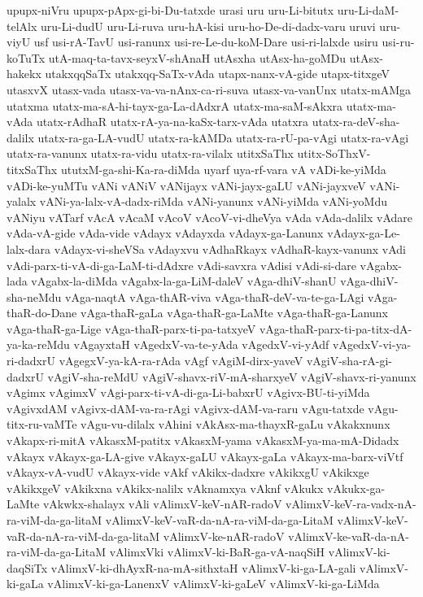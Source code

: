 {upupx-niVru
upupx-pApx-gi-bi-Du-tatxde
urasi
uru
uru-Li-bitutx
uru-Li-daM-telAlx
uru-Li-dudU
uru-Li-ruva
uru-hA-kisi
uru-ho-De-di-dadx-varu
uruvi
uru-viyU
usf
usi-rA-TavU
usi-ranunx
usi-re-Le-du-koM-Dare
usi-ri-lalxde
usiru
usi-ru-koTuTx
utA-maq-ta-tavx-seyxV-shAnaH
utAsxha
utAsx-ha-goMDu
utAsx-hakekx
utakxqqSaTx
utakxqq-SaTx-vAda
utapx-nanx-vA-gide
utapx-titxgeV
utasxvX
utasx-vada
utasx-va-va-nAnx-ca-ri-suva
utasx-va-vanUnx
utatx-mAMga
utatxma
utatx-ma-sA-hi-tayx-ga-La-dAdxrA
utatx-ma-saM-sAkxra
utatx-ma-vAda
utatx-rAdhaR
utatx-rA-ya-na-kaSx-tarx-vAda
utatxra
utatx-ra-deV-sha-dalilx
utatx-ra-ga-LA-vudU
utatx-ra-kAMDa
utatx-ra-rU-pa-vAgi
utatx-ra-vAgi
utatx-ra-vanunx
utatx-ra-vidu
utatx-ra-vilalx
utitxSaThx
utitx-SoThxV-titxSaThx
ututxM-ga-shi-Ka-ra-diMda
uyarf
uya-rf-vara
vA
vADi-ke-yiMda
vADi-ke-yuMTu
vANi
vANiV
vANijayx
vANi-jayx-gaLU
vANi-jayxveV
vANi-yalalx
vANi-ya-lalx-vA-dadx-riMda
vANi-yanunx
vANi-yiMda
vANi-yoMdu
vANiyu
vATarf
vAcA
vAcaM
vAcoV
vAcoV-vi-dheVya
vAda
vAda-dalilx
vAdare
vAda-vA-gide
vAda-vide
vAdayx
vAdayxda
vAdayx-ga-Lanunx
vAdayx-ga-Le-lalx-dara
vAdayx-vi-sheVSa
vAdayxvu
vAdhaRkayx
vAdhaR-kayx-vanunx
vAdi
vAdi-parx-ti-vA-di-ga-LaM-ti-dAdxre
vAdi-savxra
vAdisi
vAdi-si-dare
vAgabx-lada
vAgabx-la-diMda
vAgabx-la-ga-LiM-daleV
vAga-dhiV-shanU
vAga-dhiV-sha-neMdu
vAga-naqtA
vAga-thAR-viva
vAga-thaR-deV-va-te-ga-LAgi
vAga-thaR-do-Dane
vAga-thaR-gaLa
vAga-thaR-ga-LaMte
vAga-thaR-ga-Lanunx
vAga-thaR-ga-Lige
vAga-thaR-parx-ti-pa-tatxyeV
vAga-thaR-parx-ti-pa-titx-dA-ya-ka-reMdu
vAgayxtaH
vAgedxV-va-te-yAda
vAgedxV-vi-yAdf
vAgedxV-vi-ya-ri-dadxrU
vAgegxV-ya-kA-ra-rAda
vAgf
vAgiM-dirx-yaveV
vAgiV-sha-rA-gi-dadxrU
vAgiV-sha-reMdU
vAgiV-shavx-riV-mA-sharxyeV
vAgiV-shavx-ri-yanunx
vAgimx
vAgimxV
vAgi-parx-ti-vA-di-ga-Li-babxrU
vAgivx-BU-ti-yiMda
vAgivxdAM
vAgivx-dAM-va-ra-rAgi
vAgivx-dAM-va-raru
vAgu-tatxde
vAgu-titx-ru-vaMTe
vAgu-vu-dilalx
vAhini
vAkAsx-ma-thayxR-gaLu
vAkakxnunx
vAkapx-ri-mitA
vAkasxM-patitx
vAkasxM-yama
vAkasxM-ya-ma-mA-Didadx
vAkayx
vAkayx-ga-LA-give
vAkayx-gaLU
vAkayx-gaLa
vAkayx-ma-barx-viVtf
vAkayx-vA-vudU
vAkayx-vide
vAkf
vAkikx-dadxre
vAkikxgU
vAkikxge
vAkikxgeV
vAkikxna
vAkikx-nalilx
vAknamxya
vAknf
vAkukx
vAkukx-ga-LaMte
vAkwkx-shalayx
vAli
vAlimxV-keV-nAR-radoV
vAlimxV-keV-ra-vadx-nA-ra-viM-da-ga-litaM
vAlimxV-keV-vaR-da-nA-ra-viM-da-ga-LitaM
vAlimxV-keV-vaR-da-nA-ra-viM-da-ga-litaM
vAlimxV-ke-nAR-radoV
vAlimxV-ke-vaR-da-nA-ra-viM-da-ga-LitaM
vAlimxVki
vAlimxV-ki-BaR-ga-vA-naqSiH
vAlimxV-ki-daqSiTx
vAlimxV-ki-dhAyxR-na-mA-sithxtaH
vAlimxV-ki-ga-LA-gali
vAlimxV-ki-gaLa
vAlimxV-ki-ga-LanenxV
vAlimxV-ki-gaLeV
vAlimxV-ki-ga-LiMda
}
